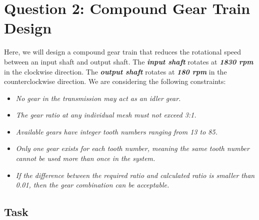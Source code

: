 \documentclass[12pt]{article}
\begin{document}
\section{Question 2: Compound Gear Train Design}

Here, we will design a compound gear train that reduces the rotational speed between an input shaft and output shaft. The \textit{\textbf{input shaft}} rotates at \textit{\textbf{1830 rpm}} in the clockwise direction. The \textit{\textbf{output shaft}} rotates at \textit{\textbf{180 rpm}} in the counterclockwise direction. We are considering the following constraints:

\begin{itemize}

    \item [(a)] \textit{No gear in the transmission may act as an idler gear.}
    \item [(b)] \textit{The gear ratio at any individual mesh must not exceed 3:1.}
    \item [(c)] \textit{Available gears have integer tooth numbers ranging from 13 to 85.}
    \item [(d)] \textit{Only one gear exists for each tooth number, meaning the same tooth number cannot be used more than
              once in the system.}
    \item [(e)] \textit{If the difference between the required ratio and calculated ratio is smaller than 0.01, then the gear
              combination can be acceptable.}

\end{itemize}

\subsection{Task}
\end{document}
